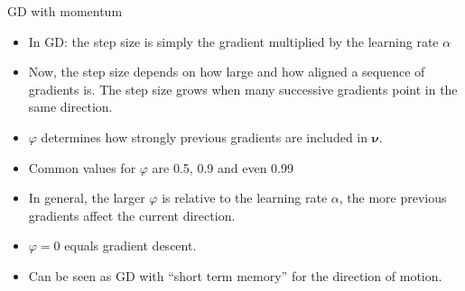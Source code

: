 \documentclass[11pt,compress,t,notes=noshow, xcolor=table]{beamer}
\begin{document}
\begin{vbframe}{GD with momentum}
\begin{itemize}
\item In GD: the step size is simply the gradient multiplied by the learning rate $\alpha$
\item Now, the step size depends on how large and how aligned a sequence of gradients is. The step size grows when many successive gradients point in the same direction.
\item $\varphi$ determines how strongly previous gradients are included in $\bm{\nu}$.
\item Common values for $\varphi$ are 0.5, 0.9 and even 0.99
\item In general, the larger $\varphi$ is relative to the learning rate $\alpha$, the more previous gradients affect the current direction. 
\item $\varphi = 0$ equals gradient descent.
\item Can be seen as GD with \enquote{short term memory} for the direction of motion.
\end{itemize}

\end{vbframe}





\end{document}
